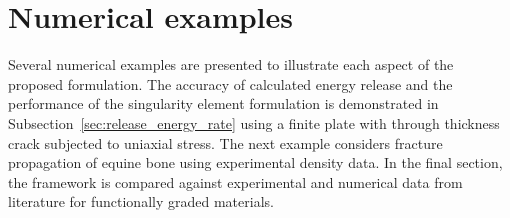 \documentclass[onecolumn]{svjour3}
\begin{document}
% 
\section{Numerical examples}
\label{sec:numerical_examples}
Several numerical examples are presented to illustrate each aspect of the proposed formulation. 
The accuracy of calculated energy release and the performance of the singularity element formulation is demonstrated in Subsection~\ref{sec:release_energy_rate} using a finite plate with through thickness crack subjected to uniaxial stress.  The next example considers fracture propagation of equine bone using experimental density data. In the final section, the framework is compared against experimental and numerical data from literature for functionally graded materials.
\end{document}
